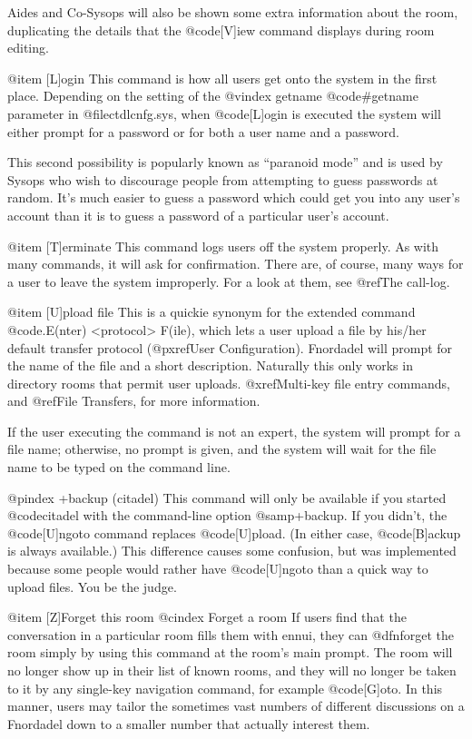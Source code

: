 Aides and Co-Sysops will also be shown some extra information about the
room, duplicating the details that the @code{[V]iew} command displays
during room editing.

@item [L]ogin
This command is how all users get onto the system in the
first place.  Depending on the setting of the
@vindex getname
@code{#getname} parameter
in @file{ctdlcnfg.sys}, when @code{[L]ogin} is executed the system will either
prompt for a password or for both a user name and a password.

This second possibility is popularly known as ``paranoid
mode'' and is used by Sysops who wish to discourage people from
attempting to guess passwords at random.  It's much easier to guess
a password which could get you into any user's account than it is
to guess a password of a particular user's account.

@item [T]erminate
This command logs users off the system properly.  As with
many commands, it will ask for confirmation.  There are, of course,
many ways for a user to leave the system improperly.  For a look
at them, see @ref{The call-log}.

@item [U]pload file
This is a quickie synonym for the extended command
@code{.E(nter) <protocol> F(ile)},
which lets a user upload a file by his/her default
transfer protocol (@pxref{User Configuration}).
Fnordadel will prompt for the name of the file and a
short description.  Naturally this only works in directory rooms that
permit user uploads.
@xref{Multi-key file entry commands}, and @ref{File Transfers},
for more information.

If the user executing the
command is not an expert, the system will prompt for a file name;
otherwise, no prompt is given, and the system will wait for the file
name to be typed on the command line.

@pindex +backup (citadel)
This command will only be available if you started @code{citadel}
with the command-line option @samp{+backup}.  If you didn't, the @code{[U]ngoto}
command replaces @code{[U]pload}.  (In either case,
@code{[B]ackup} is always available.)  This difference causes some
confusion, but was implemented because some people would rather have
@code{[U]ngoto} than a quick way to upload files.  You be the judge.

@item [Z]Forget this room
@cindex Forget a room
If users find that the conversation in a particular room
fills them with ennui, they can @dfn{forget} the room simply by using
this command at the room's main prompt.  The room will no longer show
up in their list of known rooms, and they will no longer be taken to it
by any single-key navigation command, for example @code{[G]oto}.  In this
manner, users may tailor the sometimes vast numbers of different
discussions on a Fnordadel down to a smaller number that actually
interest them.

